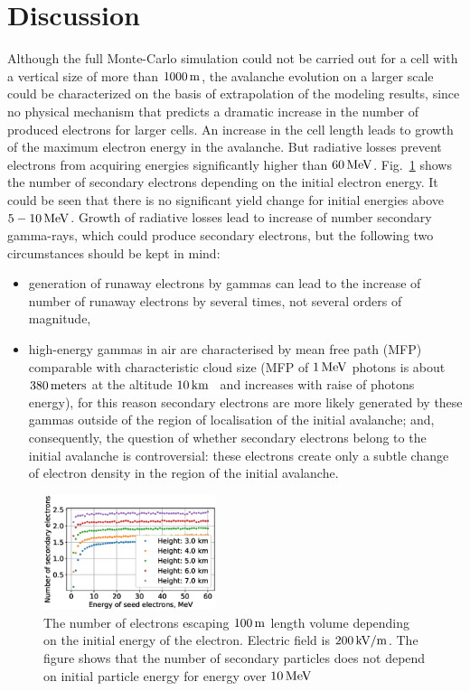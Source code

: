 \documentclass[doublecol,linenumbers]{epl2} %
\begin{document}
	\section{Discussion}
	Although the full Monte-Carlo simulation could not be carried out for a cell with a vertical size of more than $1000\un{m}$, the avalanche evolution on a larger scale could be characterized on the basis of extrapolation of the modeling results, since no physical mechanism that predicts a dramatic increase in the number of produced electrons for larger cells. 
	An increase in the cell length leads to growth of the maximum electron energy in the avalanche. But radiative losses prevent electrons from acquiring energies significantly higher than $60\un{MeV}$. Fig.~\ref{fig:sec} shows the number of secondary electrons depending on the initial electron energy. It could be seen that there is no significant yield change for initial energies above $5-10\un{MeV}$. Growth of radiative losses lead to increase of number secondary gamma-rays, which could produce secondary electrons, but the following two circumstances should be kept in mind:
		\begin{itemize}
			\item generation of runaway electrons by gammas can lead to the increase of number of runaway electrons by several times, not several orders of magnitude,
			\item high-energy gammas in air are characterised by mean free path (MFP) comparable with characteristic cloud size (MFP of $1\un{MeV}$ photons is about $380\un{meters}$ at the altitude $10\un{km}$~\cite{xcom} and increases with raise of photons energy), for this reason secondary electrons are more likely generated by these gammas outside of the region of localisation of the initial avalanche; and, consequently, the question of whether secondary electrons belong to the initial avalanche is controversial: these electrons create only a subtle change of electron density in the region of the initial avalanche.
	\end{itemize}
	\begin{figure}[h]
		\centering
		\includegraphics[width=0.45\textwidth]{figures/secondary.eps}
		\caption{The number of electrons escaping $100~\un{m}$ length volume depending on the initial energy of the electron. Electric field is $200\un{kV/m}$. The figure shows that the number of secondary particles does not depend on initial particle energy for energy over $10\un{MeV}$}
		\label{fig:sec}
	\end{figure} 
	
\end{document}
